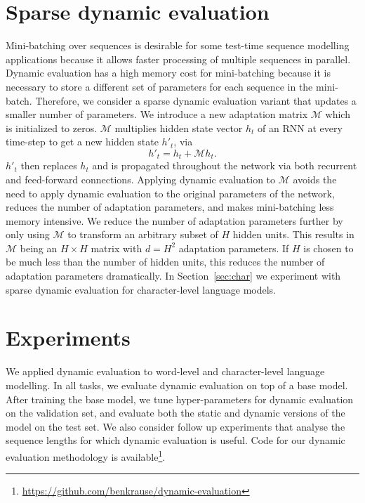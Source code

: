 \documentclass{article} %
\begin{document}
\section{Sparse dynamic evaluation}
\label{sec:mem}


Mini-batching over sequences is desirable for some test-time sequence modelling applications because it allows faster processing of multiple sequences in parallel. Dynamic evaluation has a high memory cost for mini-batching because it is necessary to store a different set of parameters for each sequence in the mini-batch. Therefore, we consider a sparse dynamic evaluation variant that updates a smaller number of parameters. We introduce a new adaptation matrix $\mathcal{M}$ which is initialized to zeros. $\mathcal{M}$ multiplies hidden state vector $h_t$ of an RNN at every time-step to get a new hidden state $h'_t$, via
\begin{equation}
h'_t = h_t + \mathcal{M} h_t .
\end{equation}
$h'_t$ then replaces $h_t$ and is propagated throughout the network via both recurrent and feed-forward connections. Applying dynamic evaluation to $\mathcal{M}$ avoids the need to apply dynamic evaluation to the original parameters of the network, reduces the number of adaptation parameters, and makes mini-batching less memory intensive. We reduce the number of adaptation parameters further by only using $\mathcal{M}$ to transform an arbitrary subset of $H$ hidden units. This results in $\mathcal{M}$ being an $H\!\times\!H$ matrix with $d=H^2$ adaptation parameters. If $H$ is chosen to be much less than the number of hidden units, this reduces the number of adaptation parameters dramatically. In Section~\ref{sec:char} we experiment with sparse dynamic evaluation for character-level language models.



\section{Experiments}

We applied dynamic evaluation to word-level and character-level language modelling.  In all tasks, we evaluate dynamic evaluation on top of a base model. After training the base model, we tune hyper-parameters for dynamic evaluation on the validation set, and evaluate both the static and dynamic versions of the model on the test set. We also consider follow up experiments that analyse the sequence lengths for which dynamic evaluation is useful. Code for our dynamic evaluation methodology is available\footnote{\url{https://github.com/benkrause/dynamic-evaluation}}.
\end{document}
